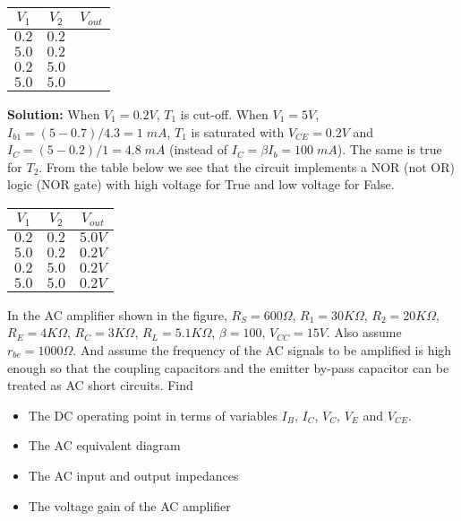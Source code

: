 \begin{enumerate}
\begin{tabular}{cc|c} \hline
$V_1$ & $V_2$ & $V_{out}$ \\ \hline
  $0.2$ & $0.2$ &         \\
  $5.0$ & $0.2$ &         \\
  $0.2$ & $5.0$ &         \\
  $5.0$ & $5.0$ &         \hline
\end{tabular}


{\bf Solution:} When $V_1=0.2V$, $T_1$ is cut-off. When $V_1=5V$, 
$I_{b1}=(5-0.7)/4.3=1\;mA$, $T_1$ is saturated with $V_{CE}=0.2V$
and $I_C=(5-0.2)/1=4.8\;mA$ (instead of $I_C=\beta I_b=100\;mA$).
The same is true for $T_2$. From the table below we see that the
circuit implements a NOR (not OR) logic (NOR gate) with high 
voltage for True and low voltage for False. 

\begin{tabular}{cc|c}\hline
$V_1$ & $V_2$ & $V_{out}$ \\ \hline
  $0.2$ & $0.2$ & $5.0V$ \\
  $5.0$ & $0.2$ & $0.2V$ \\
  $0.2$ & $5.0$ & $0.2V$ \\
  $5.0$ & $5.0$ & $0.2V$ \hline
\end{tabular}
\end{enumerate}




\item In the AC amplifier shown in the figure, $R_S=600\Omega$, $R_1=30K\Omega$, 
$R_2=20K\Omega$, $R_E=4K\Omega$, $R_C=3K\Omega$, $R_L=5.1K\Omega$, 
$\beta=100$, $V_{CC}=15V$. Also assume $r_{be}=1000\Omega$. And assume the
frequency of the AC signals to be amplified is high enough so that the
coupling capacitors and the emitter by-pass capacitor can be treated as 
AC short circuits. Find
\begin{itemize}
\item The DC operating point in terms of variables $I_B$, $I_C$, $V_C$, $V_E$ 
  and $V_{CE}$.
\item The AC equivalent diagram
\item The AC input and output impedances
\item The voltage gain of the AC amplifier
\end{itemize}


